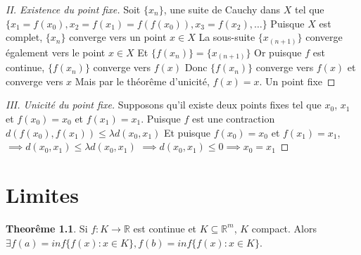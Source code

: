 \documentclass[12pt]{book}
\let\Bbb\mathbb
\def\sep{\phantom{}}
\theoremstyle{definition}
\newtheorem{theorem}{Theorême}[section]
\begin{document}
\begin{comment}
    On construit une suite récursive, qui on le verra aura des propriétés intéressantes. \sep 
    On cherche à démontrer que c'est une suite de Cauchy. \sep
    Puisque $f$ est une fonction \hyperref[def:lambda_contractante]{$\lambda$-contractante} \sep 
    On utilise la définition de notre suite récursive. \sep 
    On "remonte" la différence de la suite jusqu'au début. \sep 
    Attention ca ne marche que pour $\lambda \geq 0$!. \sep 
    Par l'inégalité du triangle sur les suites. \sep 
    Grâce à notre inégalité $d(x_n x_{n+1}) \leq \lambda^n d(x_0, x_1)$ \sep
    On factorise nos $\lambda$ \sep 
    On équivaut nos $\lambda$ en une sommation pour retrouver la série géométrique \sep.
    En effet, une série finie positive est nécessairement plus petite qu'une série infinie positive \sep.
    On utilise le fait que la série géométrique infinie converge vers $\frac{1}{1-\lambda}$ \sep.
\end{comment}

\begin{proof}[II. Existence du point fixe]
    Soit $\{x_n\}$, une suite de Cauchy dans $X$ tel que $\{x_1 = f(x_0), x_2 = f(x_1) = f(f(x_0)), x_3 = f(x_2), \dots \}$ \sep
    Puisque $X$ est complet, $\{x_n\}$ converge vers un point $x \in X$ \sep 
    La sous-suite $\{x_{(n+1)}\}$ converge également vers le point $x \in X$ \sep
    Et $\{f(x_n)\} = \{x_{(n + 1)}\}$ \sep 
    Or puisque $f$ est continue, $\{f(x_n)\}$ converge vers $f(x)$ \sep 
    Donc $\{f(x_n)\}$ converge vers $f(x)$ et converge vers $x$ \sep
    Mais par le théorême d'unicité, $f(x) = x$. Un point fixe \sep  
\end{proof}
\begin{proof}[III. Unicité du point fixe]
    Supposons qu'il existe deux points fixes tel que $x_0$, $x_1$ et $f(x_0) = x_0$ et $f(x_1) = x_1$. \sep 
    Puisque $f$ est une contraction $d(f(x_0), f(x_1)) \leq \lambda d(x_0, x_1)$ \sep 
    Et puisque $f(x_0) = x_0$ et $f(x_1) = x_1$, $\implies d(x_0, x_1) \leq \lambda d(x_0, x_1)$ \sep 
    $\implies d(x_0, x_1) \leq 0 \implies x_0 = x_1$
\end{proof}

\chapter{Limites}

\begin{theorem}
    Si $f: K \to \Bbb R$ est continue et $K \subseteq \Bbb R^m$, $K$ compact. Alors $\exists f(a) = inf\{f(x) : x \in K\}, f(b) = inf\{f(x) : x \in K\}$.
\end{theorem}
\end{document}
